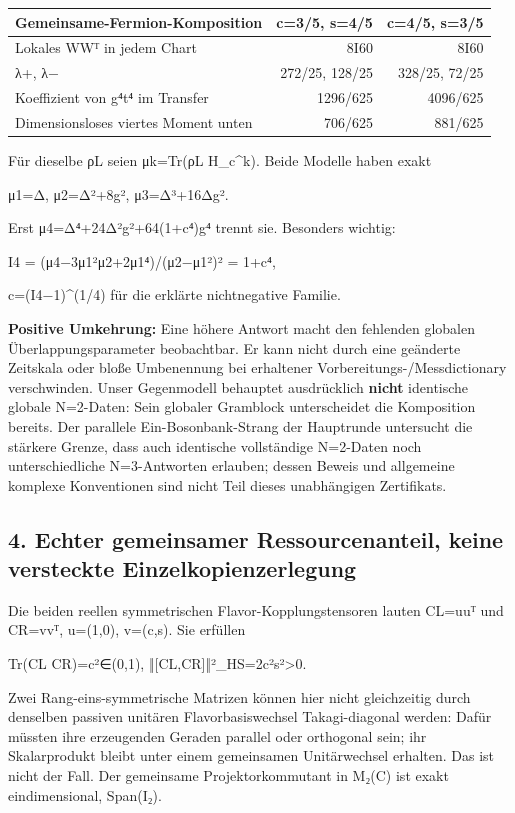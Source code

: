 {\def\LTcaptype{none} %
\begin{longtable}[]{@{}lrr@{}}
\toprule\noalign{}
Gemeinsame-Fermion-Komposition & c=3/5, s=4/5 & c=4/5, s=3/5 \\
\midrule\noalign{}
\endhead
\bottomrule\noalign{}
\endlastfoot
Lokales WWᵀ in jedem Chart & 8I60 & 8I60 \\
λ+, λ− & 272/25, 128/25 & 328/25, 72/25 \\
Koeffizient von g⁴t⁴ im Transfer & 1296/625 & 4096/625 \\
Dimensionsloses viertes Moment unten & 706/625 & 881/625 \\
\end{longtable}
}

Für dieselbe ρL seien μk=Tr(ρL H\_c\^{}k). Beide Modelle haben exakt

μ1=Δ, μ2=Δ²+8g², μ3=Δ³+16Δg².

Erst μ4=Δ⁴+24Δ²g²+64(1+c⁴)g⁴ trennt sie. Besonders wichtig:

I4 = (μ4−3μ1²μ2+2μ1⁴)/(μ2−μ1²)² = 1+c⁴,

c=(I4−1)\^{}(1/4) für die erklärte nichtnegative Familie.

\textbf{Positive Umkehrung:} Eine höhere Antwort macht den fehlenden
globalen Überlappungsparameter beobachtbar. Er kann nicht durch eine
geänderte Zeitskala oder bloße Umbenennung bei erhaltener
Vorbereitungs-/Messdictionary verschwinden. Unser Gegenmodell behauptet
ausdrücklich \textbf{nicht} identische globale N=2-Daten: Sein globaler
Gramblock unterscheidet die Komposition bereits. Der parallele
Ein-Bosonbank-Strang der Hauptrunde untersucht die stärkere Grenze, dass
auch identische vollständige N=2-Daten noch unterschiedliche
N=3-Antworten erlauben; dessen Beweis und allgemeine komplexe
Konventionen sind nicht Teil dieses unabhängigen Zertifikats.

\subsection{4. Echter gemeinsamer Ressourcenanteil, keine versteckte
Einzelkopienzerlegung}\label{echter-gemeinsamer-ressourcenanteil-keine-versteckte-einzelkopienzerlegung}

Die beiden reellen symmetrischen Flavor-Kopplungstensoren lauten CL=uuᵀ
und CR=vvᵀ, u=(1,0), v=(c,s). Sie erfüllen

Tr(CL CR)=c²∈(0,1), ‖{[}CL,CR{]}‖²\_HS=2c²s²\textgreater0.

Zwei Rang-eins-symmetrische Matrizen können hier nicht gleichzeitig
durch denselben passiven unitären Flavorbasiswechsel Takagi-diagonal
werden: Dafür müssten ihre erzeugenden Geraden parallel oder orthogonal
sein; ihr Skalarprodukt bleibt unter einem gemeinsamen Unitärwechsel
erhalten. Das ist nicht der Fall. Der gemeinsame Projektorkommutant in
M₂(C) ist exakt eindimensional, Span(I₂).

